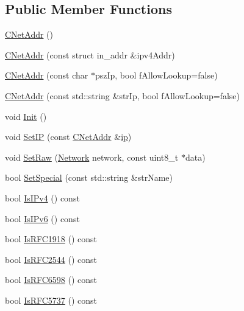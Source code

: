 \subsection*{Public Member Functions}
\begin{DoxyCompactItemize}
\item 
\mbox{\hyperlink{class_c_net_addr_ad997a7ab057fbeab1dd6601135f8e02d}{C\+Net\+Addr}} ()
\item 
\mbox{\hyperlink{class_c_net_addr_a0af492cd8aca9bbaa3392cdbfbb55681}{C\+Net\+Addr}} (const struct in\+\_\+addr \&ipv4\+Addr)
\item 
\mbox{\hyperlink{class_c_net_addr_a3549332f92d95ccadf262bdce9f4eacf}{C\+Net\+Addr}} (const char $\ast$psz\+Ip, bool f\+Allow\+Lookup=false)
\item 
\mbox{\hyperlink{class_c_net_addr_ae237602be0e4bce6ff31061270371144}{C\+Net\+Addr}} (const std\+::string \&str\+Ip, bool f\+Allow\+Lookup=false)
\item 
void \mbox{\hyperlink{class_c_net_addr_adab412fbc5a9203bea90ae173996ab10}{Init}} ()
\item 
void \mbox{\hyperlink{class_c_net_addr_a1c6087345e5ca07a151451cd6deb974f}{Set\+IP}} (const \mbox{\hyperlink{class_c_net_addr}{C\+Net\+Addr}} \&\mbox{\hyperlink{class_c_net_addr_acff7ce68f33f8dfbfe6d79d80928d417}{ip}})
\item 
void \mbox{\hyperlink{class_c_net_addr_a1f0b23aca4ca78c11735d13f3583b7ad}{Set\+Raw}} (\mbox{\hyperlink{netbase_8h_acc9a38c714afe79b5035cb36f560dac3}{Network}} network, const uint8\+\_\+t $\ast$data)
\item 
bool \mbox{\hyperlink{class_c_net_addr_aa3e44dfd064d9d8da1cb48cdcb7dd231}{Set\+Special}} (const std\+::string \&str\+Name)
\item 
bool \mbox{\hyperlink{class_c_net_addr_a7021b79e9a33c342b68db09dbb6c2293}{Is\+I\+Pv4}} () const
\item 
bool \mbox{\hyperlink{class_c_net_addr_aad5f7a372c56ccf4d773f728b6b46e18}{Is\+I\+Pv6}} () const
\item 
bool \mbox{\hyperlink{class_c_net_addr_a6c6d7376d8d0ae4c7cb0893add58069f}{Is\+R\+F\+C1918}} () const
\item 
bool \mbox{\hyperlink{class_c_net_addr_acd1138ebc48eb28055a49e5ffe8ebc31}{Is\+R\+F\+C2544}} () const
\item 
bool \mbox{\hyperlink{class_c_net_addr_a6a9595f10a7cb4518d9d577075eee57f}{Is\+R\+F\+C6598}} () const
\item 
bool \mbox{\hyperlink{class_c_net_addr_a5a3b09eb486dede48cb9427a9a0ed2e2}{Is\+R\+F\+C5737}} () const

\end{DoxyCompactItemize}
